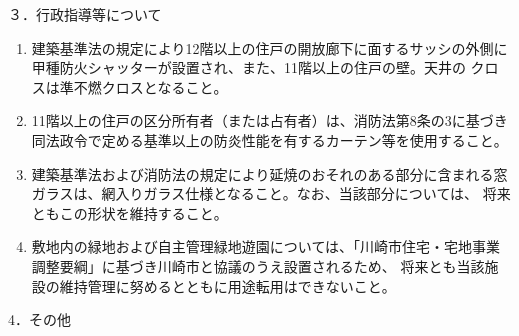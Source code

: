 \documentclass[
  luatex,
  paper=a4paper,
  fontsize=11pt,
  jafontsize=11pt,
  jlreq_notes,
]{jlreq}
\begin{document}
  ３．行政指導等について
  \begin{enumerate}
  \item 建築基準法の規定により12階以上の住戸の開放廊下に面するサッシの外側に甲種防火シャッターが設置され、また、11階以上の住戸の壁。天井の クロスは準不燃クロスとなること。
  \item 11階以上の住戸の区分所有者（または占有者）は、消防法第8条の3に基づき同法政令で定める基準以上の防炎性能を有するカーテン等を使用すること。
  \item 建築基準法および消防法の規定により延焼のおそれのある部分に含まれる窓ガラスは、網入りガラス仕様となること。なお、当該部分については、
        将来ともこの形状を維持すること。
  \item 敷地内の緑地および自主管理緑地遊園については、「川崎市住宅・宅地事業調整要綱」に基づき川崎市と協議のうえ設置されるため、
        将来とも当該施設の維持管理に努めるとともに用途転用はできないこと。
  \end{enumerate}
  4．その他
\end{document}
